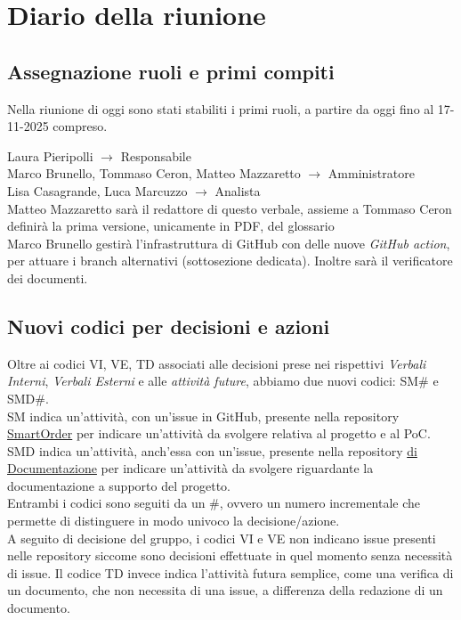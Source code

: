 \section{Diario della riunione}

\subsection{Assegnazione ruoli e primi compiti}
Nella riunione di oggi sono stati stabiliti i primi ruoli, a partire da oggi fino al 17-11-2025 compreso.\\
\begin{center}
	Laura Pieripolli $\to$ Responsabile \\
	Marco Brunello, Tommaso Ceron, Matteo Mazzaretto $\to$ Amministratore \\
	Lisa Casagrande, Luca Marcuzzo $\to$ Analista \\
	Matteo Mazzaretto sarà il redattore di questo verbale, assieme a Tommaso Ceron definirà la prima versione, unicamente in PDF, del glossario\\
	Marco Brunello gestirà l'infrastruttura di GitHub con delle nuove \textit{GitHub action}, per attuare i branch alternativi (sottosezione dedicata). Inoltre sarà il verificatore dei documenti.\\
\end{center}
\subsection{Nuovi codici per decisioni e azioni}
Oltre ai codici VI, VE, TD associati alle decisioni prese nei rispettivi \textit{Verbali Interni}, \textit{Verbali Esterni} e alle \textit{attività future}, abbiamo due nuovi codici: SM$\#$ e SMD$\#$.\\
SM indica un'attività, con un'issue in GitHub, presente nella repository \href{https://gtihub.com/nullpointersgroup/smartorder}{SmartOrder} per indicare un'attività da svolgere relativa al progetto e al PoC.\\
SMD indica un'attività, anch'essa con un'issue, presente nella repository \href{https://gtihub.com/nullpointersgroup/documentazione}{di Documentazione} per indicare un'attività da svolgere riguardante la documentazione a supporto del progetto.\\
Entrambi i codici sono seguiti da un \#, ovvero un numero incrementale che permette di distinguere in modo univoco la decisione/azione.\\
A seguito di decisione del gruppo, i codici VI e VE non indicano issue presenti nelle repository siccome sono decisioni effettuate in quel momento senza necessità di issue. Il codice TD invece indica l'attività futura semplice, come una verifica di un documento, che non necessita di una issue, a differenza della redazione di un documento.
